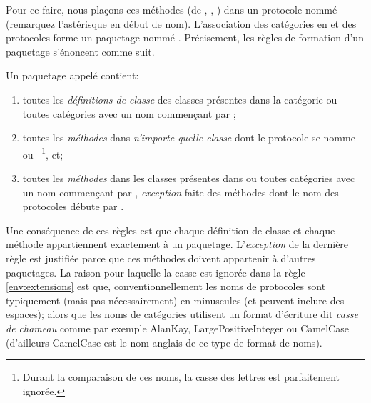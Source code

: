 \documentclass[a4paper,10pt,twoside]{book}
\begin{document}
Pour ce faire, nous plaçons ces méthodes (de , ,  \etc) dans un protocole nommé  (remarquez l'astérisque en début de nom). L'association des
catégories en  et des protocoles  
forme un paquetage nommé .
Précisement, les règles de formation d'un paquetage s'énoncent comme suit.

Un paquetage appelé  contient:

\begin{enumerate}		
	\item{} toutes les \emph{définitions de classe} des classes présentes dans
la catégorie  ou toutes catégories avec un nom commençant par
;
	\item{} \label{env:extensions} toutes les \emph{méthodes}
dans \emph{n'importe quelle classe} dont le protocole se nomme
 ou ~\footnote{Durant la comparaison
de ces noms, la casse des lettres est parfaitement ignorée.}, et;
\item{} toutes les \emph{méthodes} dans les classes présentes dans
 ou toutes catégories avec un nom commençant par , 
\emph{exception} faite des méthodes dont le nom des protocoles débute par 
\prot{*}.
\end{enumerate}

\noindent
Une conséquence de ces règles est que chaque définition de classe et chaque 
méthode appartiennent exactement à un paquetage. 
L'\emph{exception} de la dernière règle est justifiée parce que
ces méthodes doivent appartenir à d'autres paquetages.
La raison pour laquelle la casse
est ignorée dans la règle \ref{env:extensions} 
est que, conventionnellement les noms de protocoles sont typiquement
(mais pas nécessairement) en minuscules (et peuvent inclure des espaces); alors que 
les noms de catégories utilisent un format d'écriture dit \emph{casse de chameau} comme par 
exemple AlanKay, LargePositiveInteger ou CamelCase (d'ailleurs CamelCase est 
le nom anglais de ce type de format de noms).
\end{document}
